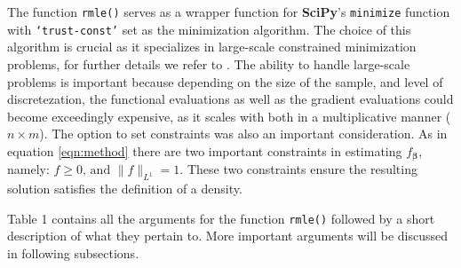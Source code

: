 \documentclass[a4paper,12pt]{article}
\newcommand{\bbeta}{{\boldsymbol{\beta}}}
\begin{document}
The function \texttt{rmle()} serves as a wrapper function for \textbf{SciPy}'s \texttt{minimize} function with \texttt{`trust-const'} set as the minimization algorithm. The choice of this algorithm is crucial as it specializes in large-scale constrained minimization problems, for further details we refer to \cite{byrd1999interior}. The ability to handle large-scale problems is important because depending on the size of the sample, and level of discretezation, the functional evaluations as well as the gradient evaluations could become exceedingly expensive, as it scales with both in a multiplicative manner ($n \times m$). The option to set constraints was also an important consideration. As in equation \eqref{eqn:method} there are two important constraints in estimating $f_\bbeta$, namely: $f\ge 0,\, \text{and } \|f\|_{L^1}=1$. These two constraints ensure the resulting solution satisfies the definition of a density.

Table 1 contains all the arguments for the function \texttt{rmle()} followed by a short description of what they pertain to. More important arguments will be discussed in following subsections. \\
\end{document}
